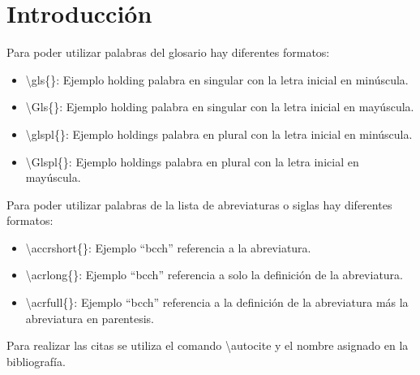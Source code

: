 \documentclass[12pt,letter,spanish]{article}
\newcommand{\q}[1]{``#1''} %
\begin{document}


\newpage

\section{Introducción}%

Para poder utilizar palabras del glosario hay diferentes formatos:
\begin{itemize}
    \item \textbackslash gls\{\}: Ejemplo \gls{holding} palabra en singular con la letra inicial en minúscula.
    \item \textbackslash Gls\{\}: Ejemplo \Gls{holding} palabra en singular con la letra inicial en mayúscula.
    \item \textbackslash glspl\{\}: Ejemplo \glspl{holding} palabra en plural con la letra inicial en minúscula.
    \item \textbackslash Glspl\{\}: Ejemplo \Glspl{holding} palabra en plural con la letra inicial en mayúscula.
    
\end{itemize}

Para poder utilizar palabras de la lista de abreviaturas o siglas hay diferentes formatos:
\begin{itemize}
    \item \textbackslash accrshort\{\}: Ejemplo \q{\acrshort{bcch}} referencia a la abreviatura.
    
    \item \textbackslash acrlong\{\}: Ejemplo \q{\acrlong{bcch}} referencia a solo la definición de la abreviatura.
    
    \item \textbackslash acrfull\{\}: Ejemplo \q{\acrfull{bcch}} referencia a la definición de la abreviatura más la abreviatura en parentesis.
    
    
\end{itemize}

Para realizar las citas se utiliza el comando \textbackslash autocite y el nombre asignado en la bibliografía. \autocite{bcch}
\end{document}
